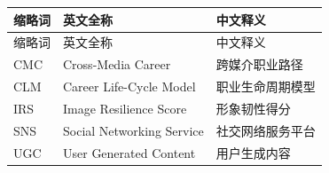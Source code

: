 \begin{longtable}{p{}p{}p{}}
\toprule
缩略词 & 英文全称 & 中文释义 \\
\midrule
\endfirsthead
\toprule
缩略词 & 英文全称 & 中文释义 \\
\midrule
\endhead
CMC & Cross-Media Career & 跨媒介职业路径 \\
CLM & Career Life-Cycle Model & 职业生命周期模型 \\
IRS & Image Resilience Score & 形象韧性得分 \\
SNS & Social Networking Service & 社交网络服务平台 \\
UGC & User Generated Content & 用户生成内容 \\
\bottomrule
\end{longtable}
